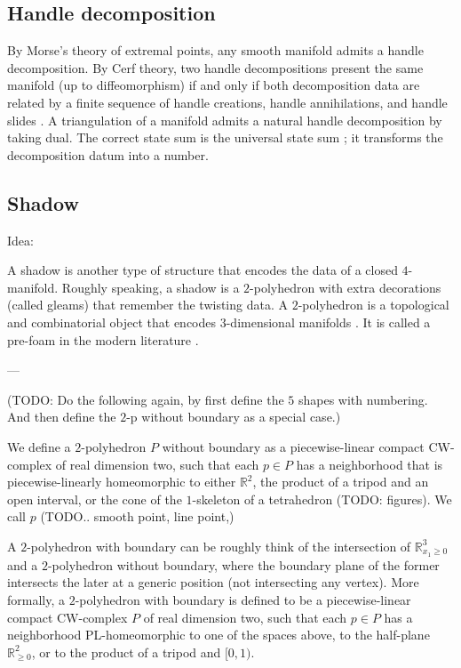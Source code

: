 \subsection{Handle decomposition}
By Morse's theory of extremal points, any smooth manifold admits
a handle decomposition. By Cerf theory, two handle decompositions
present the same manifold (up to diffeomorphism) if and only if
both decomposition data are related by a finite sequence of
handle creations, handle annihilations, and handle slides
\cite{?}. A triangulation of a manifold admits a natural handle
decomposition by taking dual. The correct state sum is the
universal state sum \cite{?}; it transforms the decomposition
datum into a number.

\subsection{Shadow}

Idea:

A shadow is another type of structure that encodes the data of a
closed $4$-manifold. Roughly speaking, a shadow is a
$2$-polyhedron with extra decorations (called gleams) that
remember the twisting data. A $2$-polyhedron is a topological and
combinatorial object that encodes $3$-dimensional manifolds
\cite{?Matveev}. It is called a pre-foam in the modern
literature \cite{khovanov-robert/foam}.

---

(TODO: Do the following again, by first define the $5$ shapes
with numbering. And then define the $2$-p without boundary as a
special case.)

We define a $2$-polyhedron $P$ without boundary as a
piecewise-linear compact CW-complex of real dimension two, such
that each $p \in P$ has a neighborhood that is piecewise-linearly
homeomorphic to either $\mathbb{R}^{2}$, the product of a tripod
and an open interval, or the cone of the $1$-skeleton of a
tetrahedron (TODO: figures). We call $p$ (TODO.. smooth point,
line point,)

A $2$-polyhedron with boundary can be roughly think of the
intersection of $\mathbb{R}^{3}_{x_{1} \geq 0}$ and a
$2$-polyhedron without boundary, where the boundary plane of the
former intersects the later at a generic position (not
intersecting any vertex). More formally, a $2$-polyhedron with
boundary is defined to be a piecewise-linear compact CW-complex
$P$ of real dimension two, such that each $p \in P$ has a
neighborhood PL-homeomorphic to one of the spaces above, to the
half-plane $\mathbb{R}^{2}_{\geq 0}$, or to the product of a
tripod and $[0,1)$.

